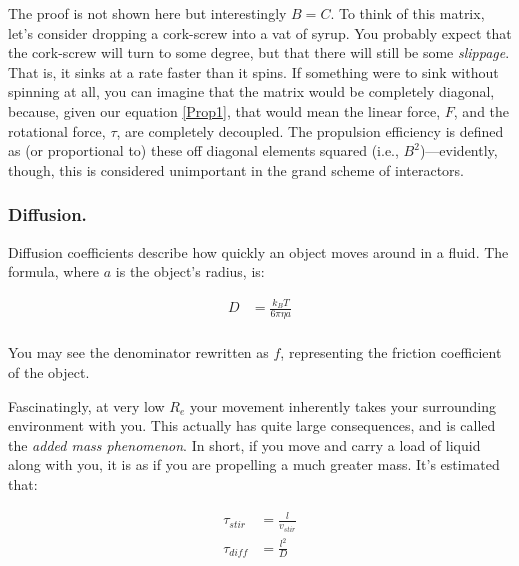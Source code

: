 \documentclass[12pt]{report}
\begin{document}
The proof is not shown here but interestingly $B = C$. To think of this matrix, let's consider dropping a cork-screw into a vat of syrup. You probably expect that the cork-screw will turn to some degree, but that there will still be some \textit{slippage}. That is, it sinks at a rate faster than it spins. If something were to sink without spinning at all, you can imagine that the matrix would be completely diagonal, because, given our equation \ref{Prop1}, that would mean the linear force, $F$, and the rotational force, $\tau$, are completely decoupled. The propulsion efficiency is defined as (or proportional to) these off diagonal elements squared (i.e., $B^2$)---evidently, though, this is considered unimportant in the grand scheme of interactors. 

\subsubsection{Diffusion.}

Diffusion coefficients describe how quickly an object moves around in a fluid. The formula, where $a$ is the object's radius, is: 

\begin{equation} \label{diffdef}
\begin{split}
D &= \frac{k_BT}{6\pi\eta a} \\
\end{split}
\end{equation}

You may see the denominator rewritten as $f$, representing the friction coefficient of the object.\newline

Fascinatingly, at very low $R_e$ your movement inherently takes your surrounding environment with you. This actually has quite large consequences, and is called the \textit{added mass phenomenon}. In short, if you move and carry a load of liquid along with you, it is as if you are propelling a much greater mass. It's estimated that: 

\begin{equation} \label{diff01}
\begin{split}
\tau_{stir} &= \frac{l}{v_{stir}} \\
\tau_{diff} &= \frac{l^2}{D} \\
\end{split}
\end{equation}
\end{document}
